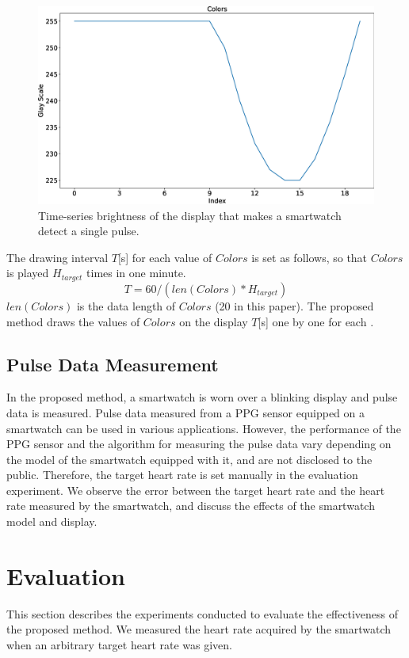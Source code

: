 \documentclass[sigchi,authordraft]{acmart}
\begin{document}
\begin{figure}[!t]
  \centering
  \includegraphics[width=0.5\linewidth]{figures/colors_wave.eps}
  \caption{Time-series brightness of the display that makes a smartwatch detect a single pulse.}
  \label{fig:colors_wave}
\end{figure}

The drawing interval $T$[s] for each value of $Colors$ is set as follows, so that $Colors$ is played $H_{target}$ times in one minute.
\begin{equation}
  \label{eqn:wait}
  T = 60 / (len(Colors) * H_{target})
\end{equation}
$len(Colors)$ is the data length of $Colors$ (20 in this paper). The proposed method draws the values of $Colors$ on the display $T$[s] one by one for each .


\subsection{Pulse Data Measurement}
In the proposed method, a smartwatch is worn over a blinking display and pulse data is measured. Pulse data measured from a PPG sensor equipped on a smartwatch can be used in various applications. However, the performance of the PPG sensor and the algorithm for measuring the pulse data vary depending on the model of the smartwatch equipped with it, and are not disclosed to the public. Therefore, the target heart rate is set manually in the evaluation experiment. We observe the error between the target heart rate and the heart rate measured by the smartwatch, and discuss the effects of the smartwatch model and display.



\section{Evaluation}
\label{sec:evaluation}
This section describes the experiments conducted to evaluate the effectiveness of the proposed method. We measured the heart rate acquired by the smartwatch when an arbitrary target heart rate was given.
\end{document}
